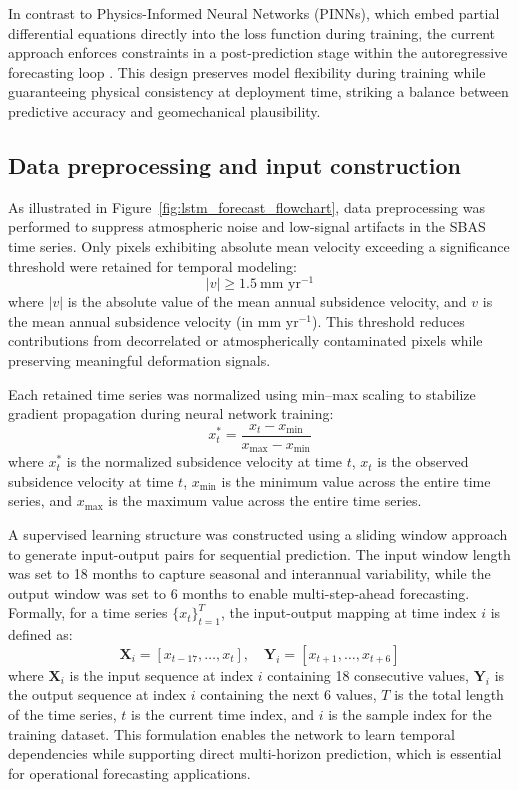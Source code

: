 \documentclass[oneside,doublespacing,flushright]{lsuthesis}
\begin{document}
In contrast to Physics-Informed Neural Networks (PINNs), which embed partial differential equations directly into the loss function during training, the current approach enforces constraints in a post-prediction stage within the autoregressive forecasting loop \citep{Raissi2019}. This design preserves model flexibility during training while guaranteeing physical consistency at deployment time, striking a balance between predictive accuracy and geomechanical plausibility.


\subsection{Data preprocessing and input construction}
As illustrated in Figure~\ref{fig:lstm_forecast_flowchart}, data preprocessing was performed to suppress atmospheric noise and low-signal artifacts in the SBAS time series. Only pixels exhibiting absolute mean velocity exceeding a significance threshold were retained for temporal modeling:
\begin{equation}
|v| \geq 1.5 \ \text{mm yr}^{-1}
\end{equation}
where $|v|$ is the absolute value of the mean annual subsidence velocity, and $v$ is the mean annual subsidence velocity (in mm yr$^{-1}$). This threshold reduces contributions from decorrelated or atmospherically contaminated pixels while preserving meaningful deformation signals.

Each retained time series was normalized using min--max scaling to stabilize gradient propagation during neural network training:
\begin{equation}
x_t^{*} = \frac{x_t - x_{\min}}{x_{\max} - x_{\min}}
\end{equation}
where $x_t^{*}$ is the normalized subsidence velocity at time $t$, $x_t$ is the observed subsidence velocity at time $t$, $x_{\min}$ is the minimum value across the entire time series, and $x_{\max}$ is the maximum value across the entire time series.


A supervised learning structure was constructed using a sliding window approach to generate input-output pairs for sequential prediction. The input window length was set to 18 months to capture seasonal and interannual variability, while the output window was set to 6 months to enable multi-step-ahead forecasting. Formally, for a time series $\{x_t\}_{t=1}^{T}$, the input-output mapping at time index $i$ is defined as:
\begin{equation}
\mathbf{X}_i = [x_{t-17}, \dots, x_t], \quad \mathbf{Y}_i = [x_{t+1}, \dots, x_{t+6}]
\end{equation}
where $\mathbf{X}_i$ is the input sequence at index $i$ containing 18 consecutive values, $\mathbf{Y}_i$ is the output sequence at index $i$ containing the next 6 values, $T$ is the total length of the time series, $t$ is the current time index, and $i$ is the sample index for the training dataset. This formulation enables the network to learn temporal dependencies while supporting direct multi-horizon prediction, which is essential for operational forecasting applications.
\end{document}

